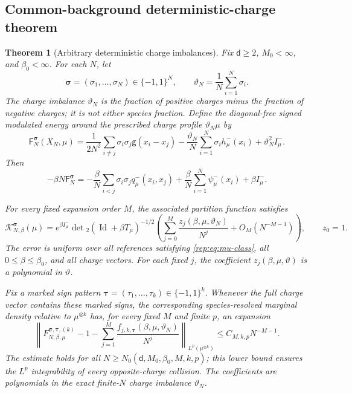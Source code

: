 \documentclass[11pt,reqno]{amsart}
\numberwithin{equation}{section}
\theoremstyle{plain}
\newtheorem{thm}{Theorem}[section]
\theoremstyle{definition}
\renewcommand{\d}{\mathsf d}
\newcommand{\Id}{\operatorname{Id}}
\newcommand{\be}{\beta}
\newcommand{\g}{\mathsf g}
\newcommand{\Fr}{\mathsf F}
\begin{document}
\subsection{Common-background deterministic-charge theorem}
\label{rep:subsec:signed-theorem}
\begin{thm}[Arbitrary deterministic charge imbalances]\label{rep:thm:arbitrary-charge}
Fix $\d\ge2$, $M_0<\infty$, and $\be_0<\infty$.  For each $N$, let
\begin{equation}\label{rep:eq:charge-vector-intro}
 \boldsymbol\sigma=(\sigma_1,\ldots,\sigma_N)\in\{-1,1\}^N,
 \qquad
 \vartheta_N=\frac1N\sum_{i=1}^N\sigma_i.
\end{equation}
The \emph{charge imbalance} $\vartheta_N$ is the fraction of positive charges minus the fraction of negative charges; it is not either species fraction.
Define the diagonal-free signed modulated energy around the prescribed charge profile $\vartheta_N\mu$ by
\begin{equation}\label{rep:eq:signed-modulated-energy-intro}
 \Fr_N^{\boldsymbol\sigma}(X_N,\mu)
 =\frac1{2N^2}\sum_{i\ne j}\sigma_i\sigma_j\g(x_i-x_j)
 -\frac{\vartheta_N}{N}\sum_{i=1}^N\sigma_i h^-_\mu(x_i)
 +\vartheta_N^2I^-_\mu.
\end{equation}
Then
\begin{equation}\label{rep:eq:signed-exact-reduction-intro}
 -\be N\Fr_N^{\boldsymbol\sigma}
 =-\frac\be N\sum_{i<j}\sigma_i\sigma_jq^-_\mu(x_i,x_j)
 +\frac\be N\sum_{i=1}^N\psi^-_\mu(x_i)+\be I^-_\mu.
\end{equation}

For every fixed expansion order $M$, the associated partition function satisfies
\begin{equation}\label{rep:eq:signed-partition-all-order-intro}
 \mathcal K_{N,\be}^{\boldsymbol\sigma}(\mu)
 =e^{\be I^-_\mu}\det{}_2(\Id+\be T_\mu)^{-1/2}
 \left(\sum_{j=0}^{M}\frac{z_j(\be,\mu,\vartheta_N)}{N^j}
 +O_M(N^{-M-1})\right),
 \qquad z_0=1.
\end{equation}
The error is uniform over all references satisfying \eqref{rep:eq:mu-class}, all $0\le\be\le\be_0$, and all charge vectors.  For each fixed $j$, the coefficient $z_j(\be,\mu,\vartheta)$ is a polynomial in $\vartheta$.

Fix a marked sign pattern $\boldsymbol\tau=(\tau_1,\ldots,\tau_k)\in\{-1,1\}^k$.  Whenever the full charge vector contains these marked signs, the corresponding species-resolved marginal density relative to $\mu^{\otimes k}$ has, for every fixed $M$ and finite $p$, an expansion
\begin{equation}\label{rep:eq:signed-marginal-all-order-intro}
 \left\|F_{N,\be,\mu}^{\boldsymbol\sigma,\boldsymbol\tau,(k)}
 -1-\sum_{j=1}^{M}\frac{f_{j,k,\boldsymbol\tau}(\be,\mu,\vartheta_N)}{N^j}
 \right\|_{L^p(\mu^{\otimes k})}
 \le C_{M,k,p}N^{-M-1}.
\end{equation}
The estimate holds for all $N\ge N_0(\d,M_0,\be_0,M,k,p)$; this lower bound ensures the $L^p$ integrability of every opposite-charge collision.  The coefficients are polynomials in the exact finite-$N$ charge imbalance $\vartheta_N$.


\end{thm}
\end{document}
